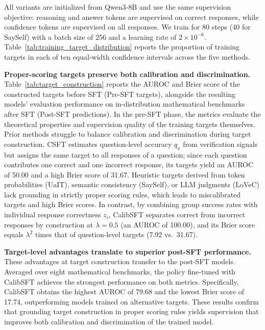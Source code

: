 \documentclass{article} %
\begin{document}
All variants are initialized from Qwen3-8B and use the same supervision objective:
reasoning and answer tokens are supervised on correct responses, while
confidence tokens are supervised on all responses. We train for 80 steps
(40 for SaySelf) with a batch size of 256 and a learning rate of
$2\times10^{-6}$. Table~\ref{tab:training_target_distribution} reports the
proportion of training targets in each of ten equal-width confidence
intervals across the five methods.



\noindent\textbf{Proper-scoring targets preserve both calibration and discrimination.}
Table~\ref{tab:target_construction} reports the AUROC and Brier score of the constructed targets before SFT (Pre-SFT targets), alongside the resulting models' evaluation performance on in-distribution mathematical benchmarks after SFT (Post-SFT predictions).
In the pre-SFT phase, the metrics evaluate the theoretical properties and supervision quality of the training targets themselves.
Prior methods struggle to balance calibration and discrimination during target construction.
CSFT estimates question-level accuracy $q_x$ from verification signals but assigns the same target to all responses of a question; since each question contributes one correct and one incorrect response, its targets yield an AUROC of 50.00 and a high Brier score of 31.67.
Heuristic targets derived from token probabilities (UaIT), semantic consistency (SaySelf), or LLM judgments (LoVeC) lack grounding in strictly proper scoring rules, which leads to miscalibrated targets and high Brier scores.
In contrast, by combining group success rates with individual response correctness $z_i$, CalibSFT separates correct from incorrect responses by construction at $\lambda=0.5$ (an AUROC of 100.00), and its Brier score equals $\lambda^2$ times that of question-level targets (7.92 vs.\ 31.67).

\noindent\textbf{Target-level advantages translate to superior post-SFT performance.}
These advantages at target construction transfer to the post-SFT models.
Averaged over eight mathematical benchmarks, the policy fine-tuned with CalibSFT achieves the strongest performance on both metrics.
Specifically, CalibSFT obtains the highest AUROC of 79.68 and the lowest Brier score of 17.74, outperforming models trained on alternative targets.
These results confirm that grounding target construction in proper scoring rules yields supervision that improves both calibration and discrimination of the trained model.
\end{document}
